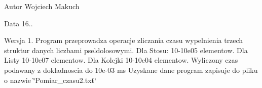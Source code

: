 \begin{DoxyAuthor}{Autor}
Wojciech Makuch 
\end{DoxyAuthor}
\begin{DoxyDate}{Data}
16.. 
\end{DoxyDate}
\begin{DoxyVersion}{Wersja}
1. Program przeprowadza operacje zliczania czasu wypelnienia trzech struktur danych liczbami pseldolosowymi. Dla Stosu\+: 10-\/10e05 elementow. Dla Listy 10-\/10e07 elementow. Dla Kolejki 10-\/10e04 elementow. Wyliczony czas podawany z dokladnoscia do 10e-\/03 ms Uzyskane dane program zapisuje do pliku o nazwie \char`\"{}\+Pomiar\+\_\+czasu2.\+txt\char`\"{} 
\end{DoxyVersion}
